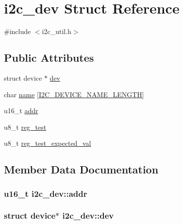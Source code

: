 \hypertarget{structi2c__dev}{}\section{i2c\+\_\+dev Struct Reference}
\label{structi2c__dev}


{\ttfamily \#include $<$i2c\+\_\+util.\+h$>$}

\subsection*{Public Attributes}
\begin{DoxyCompactItemize}
\item 
struct device $\ast$ \hyperlink{structi2c__dev_ac4b6ba60143ff90df0ddc847deed7499}{dev}
\item 
char \hyperlink{structi2c__dev_aa3e3ecd39bec0681b174122b4a5e91e5}{name} \mbox{[}\hyperlink{i2c__util_8h_a48e1e64a2a8c3e1e1df44760d2a73eaa}{I2\+C\+\_\+\+D\+E\+V\+I\+C\+E\+\_\+\+N\+A\+M\+E\+\_\+\+L\+E\+N\+G\+TH}\mbox{]}
\item 
u16\+\_\+t \hyperlink{structi2c__dev_ae9308c72bfb06fea21da16f47b4e679b}{addr}
\item 
u8\+\_\+t \hyperlink{structi2c__dev_a20bd6a8e30216a5866cfc70fec9a3203}{reg\+\_\+test}
\item 
u8\+\_\+t \hyperlink{structi2c__dev_a46e0fffcf23e10012b1f5afc774088e7}{reg\+\_\+test\+\_\+expected\+\_\+val}
\end{DoxyCompactItemize}


\subsection{Member Data Documentation}
\subsubsection[{\texorpdfstring{addr}{addr}}]{\setlength{\rightskip}{0pt plus 5cm}u16\+\_\+t i2c\+\_\+dev\+::addr}\hypertarget{structi2c__dev_ae9308c72bfb06fea21da16f47b4e679b}{}\label{structi2c__dev_ae9308c72bfb06fea21da16f47b4e679b}
\subsubsection[{\texorpdfstring{dev}{dev}}]{\setlength{\rightskip}{0pt plus 5cm}struct device$\ast$ i2c\+\_\+dev\+::dev}\hypertarget{structi2c__dev_ac4b6ba60143ff90df0ddc847deed7499}{}\label{structi2c__dev_ac4b6ba60143ff90df0ddc847deed7499}
